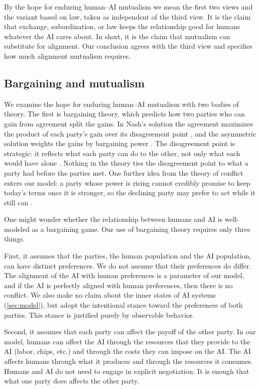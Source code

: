 \documentclass[article, 11pt, reqno]{amsart}
\theoremstyle{named}
\theoremstyle{plain}
\begin{document}
By the hope for enduring human--AI mutualism we mean the first two views and the variant based on law, taken as independent of the third view. It is the claim that exchange, subordination, or law keeps the relationship good for humans whatever the AI cares about. In short, it is the claim that mutualism can substitute for alignment. Our conclusion agrees with the third view and specifies how much alignment mutualism requires.

\subsection{Bargaining and mutualism}\label{sec:bargaining}\label{sec:biology}

We examine the hope for enduring human--AI mutualism with two bodies of theory. The first is bargaining theory, which predicts how two parties who can gain from agreement split the gains. In Nash's solution the agreement maximizes the product of each party's gain over its disagreement point \citep{Nash1950}, and the asymmetric solution weights the gains by bargaining power \citep{Kalai1977Nonsymmetric}. The disagreement point is strategic: it reflects what each party can do to the other, not only what each would have alone \citep{Nash1953}. Nothing in the theory ties the disagreement point to what a party had before the parties met. One further idea from the theory of conflict enters our model: a party whose power is rising cannot credibly promise to keep today's terms once it is stronger, so the declining party may prefer to act while it still can \citep{Fearon1995, Powell2006}.

One might wonder whether the relationship between humans and AI is well-modeled as a bargaining game. Our use of bargaining theory requires only three things.

First, it assumes that the parties, the human population and the AI population, can have distinct preferences. We do not assume that their preferences do differ. The alignment of the AI with human preferences is a parameter of our model, and if the AI is perfectly aligned with human preferences, then there is no conflict. We also make no claim about the inner states of AI systems (\cref{sec:model}), but adopt the intentional stance toward the preferences of both parties. This stance is justified purely by observable behavior.

Second, it assumes that each party can affect the payoff of the other party. In our model, humans can affect the AI through the resources that they provide to the AI (labor, chips, etc.) and through the costs they can impose on the AI. The AI affects humans through what it produces and through the resources it consumes. Humans and AI do not need to engage in explicit negotiation. It is enough that what one party does affects the other party.
\end{document}
